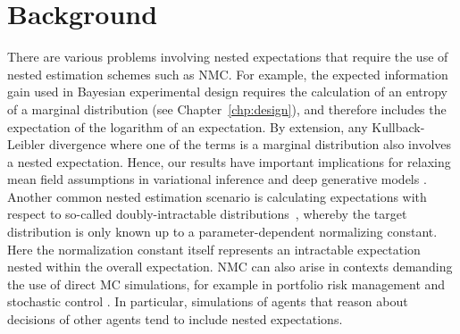 
\section{Background}
\label{sec:intro}


There are various problems involving nested expectations that require the use of nested
estimation schemes such as NMC. For example, the expected information gain used in
Bayesian experimental design requires
the calculation of an entropy of a marginal distribution (see Chapter~\ref{chp:design}), and therefore includes the
expectation of the logarithm of an expectation.  By extension, any Kullback-Leibler
divergence where one of the terms is a marginal distribution also involves a nested expectation.  Hence, our results have important implications for relaxing mean field assumptions in variational
inference \citep{hoffman2015stochastic,naesseth2017variational,maddison2017filtering} and deep generative models
\citep{burda2015importance,maaloe2016auxiliary,le2017auto}.
Another common nested estimation scenario is calculating expectations with respect to so-called
doubly-intractable distributions~\citep{moller2006efficient,murray2006mcmc,liang2010double}, whereby
the target distribution is only known up to a parameter-dependent normalizing constant.  Here
the normalization constant itself represents an intractable expectation
nested within the overall expectation.
NMC can also arise in contexts demanding the use
of direct MC simulations, for example in portfolio risk management
\citep{gordy2010nested} and stochastic control \citep{belomestny2010regression}. 
In particular, 
simulations of agents that reason about decisions of other agents tend to include nested expectations.

